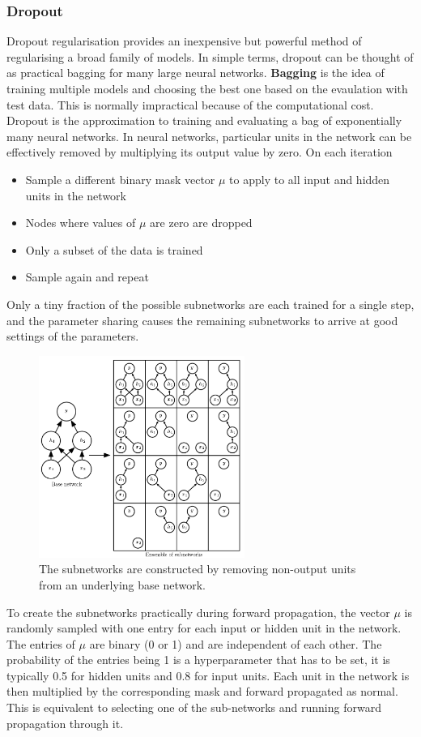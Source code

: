 \documentclass[CS5104-Notes.tex]{subfiles}
\begin{document}
\subsubsection{Dropout}
Dropout regularisation provides an inexpensive but powerful method of regularising a broad family of models. In simple terms, dropout can be thought of as practical bagging for many large neural networks. \textbf{Bagging} is the idea of training multiple models and choosing the best one based on the evaulation with test data. This is normally impractical because of the computational cost. Dropout is the approximation to training and evaluating a bag of exponentially many neural networks.
\n
In neural networks, particular units in the network can be effectively removed by multiplying its output value by zero. On each iteration
\begin{itemize}
\item Sample a different binary mask vector $\mu$ to apply to all input and hidden units in the network
\item Nodes where values of $\mu$ are zero are dropped
\item Only a subset of the data is trained
\item Sample again and repeat
\end{itemize}
Only a tiny fraction of the possible subnetworks are each trained for a single step, and the parameter sharing causes the remaining subnetworks to arrive at good settings of the parameters.
\begin{figure}[H]
  \centering
  \includegraphics[width=0.6\textwidth, keepaspectratio]{imgs/dropout.png}
  \caption{The subnetworks are constructed by removing non-output units from an underlying base network.}
\end{figure}
\noindent
To create the subnetworks practically during forward propagation, the vector $\mu$ is randomly sampled with one entry for each input or hidden unit in the network. The entries of $\mu$ are binary (0 or 1) and are independent of each other. The probability of the entries being 1 is a hyperparameter that has to be set, it is typically 0.5 for hidden units and 0.8 for input units. Each unit in the network is then multiplied by the corresponding mask and forward propagated as normal. This is equivalent to selecting one of the sub-networks and running forward propagation through it.
\end{document}
